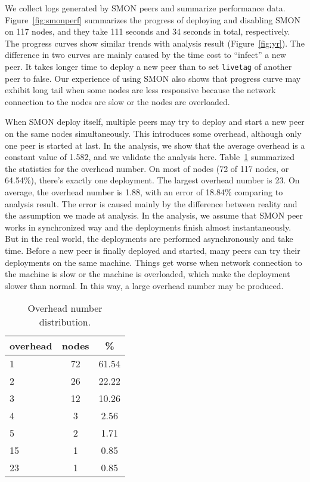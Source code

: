 We collect logs generated by SMON peers and summarize
performance data.  Figure~\ref{fig:smonperf} summarizes the
progress of deploying and disabling SMON on 117 nodes, and
they take 111 seconds and 34 seconds in total, respectively.
The progress curves show similar trends with analysis result
(Figure~\ref{fig:yr}). The difference in two curves are
mainly caused by the time cost to ``infect'' a new peer. It
takes longer time to deploy a new peer than to set
\texttt{livetag} of another peer to false. Our experience of
using SMON also shows that progress curve may exhibit long
tail when some nodes are less responsive because the network
connection to the nodes are slow or the nodes are
overloaded.

When SMON deploy itself, multiple peers may try to deploy
and start a new peer on the same nodes simultaneously. This
introduces some overhead, although only one peer is started
at last. In the analysis, we show that the average overhead
is a constant value of 1.582, and we validate the analysis
here. Table~\ref{tbl:overhead} summarized the statistics for
the overhead number. On most of nodes (72 of 117 nodes, or
64.54\%), there's exactly one deployment. The largest
overhead number is 23. On average, the overhead number is
1.88, with an error of 18.84\% comparing to analysis result.
The error is caused mainly by the difference between reality
and the assumption we made at analysis. In the analysis, we
assume that SMON peer works in synchronized way and the
deployments finish almost instantaneously. But in the real
world, the deployments are performed asynchronously and take
time. Before a new peer is finally deployed and started,
many peers can try their deployments on the same machine.
Things get worse when network connection to the machine is
slow or the machine is overloaded, which make the deployment
slower than normal. In this way, a large overhead number may
be produced.

\begin{table}[hb]
\centering
\begin{tabular}{|l|c|c|}
\hline
overhead & nodes & \% \\
\hline
1 & 72 & 61.54 \\
2 & 26 & 22.22 \\
3 & 12 & 10.26 \\
4 & 3 & 2.56 \\
5 & 2 & 1.71 \\
15 & 1 & 0.85 \\
23 & 1 & 0.85 \\
\hline
\end{tabular}
\caption{Overhead number distribution.}
\label{tbl:overhead}
\end{table}

